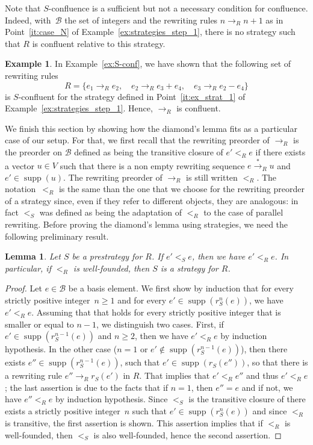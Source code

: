 \documentclass[11pt]{article}
\newtheorem{lemma}[theorem]{Lemma}
\theoremstyle{definition}
\newtheorem{example}[theorem]{Example}
\newcommand\basis{\mathscr{B}}
\newcommand\ordS{<_S}
\newcommand\ordR{<_R}
\DeclareMathOperator{\supp}{supp}
\newcommand\rewR{\to_R}
\newcommand\transR{\overset{*}{\to}_R}
\begin{document}
Note that $S$-confluence is a sufficient but not a necessary condition for
confluence. Indeed, with~$\basis$ the set of integers and the rewriting rules
$n\rewR n+1$ as in Point~\ref{it:case_N} of
Example~\ref{ex:strategies_step_1}, there is no strategy such that $R$ is
confluent relative to this strategy.
\smallskip

\begin{example}\label{ex:conf}
  In Example~\ref{ex:S-conf}, we have shown that the following set of
  rewriting rules
  \[R=\{e_1\rewR e_2,\quad e_2\rewR e_3+e_4,\quad e_3\rewR e_2-e_4\}\]
  is $S$-confluent for the strategy defined in Point~\ref{it:ex_strat_1}
  of Example~\ref{ex:strategies_step_1}. Hence, $\rewR$ is confluent.
\end{example}
\smallskip

We finish this section by showing how the diamond's lemma fits as a
particular case of our setup. For that, we first recall that the
rewriting preorder of $\rewR$ is the preorder on $\basis$ defined as
being the transitive closure of $e'\ordR e$ if there exists a vector
$u\in V$ such that there is a non empty rewriting sequence $e\transR u$
and $e'\in\supp(u)$. The rewriting preorder of $\rewR$ is still written
$\ordR$. The notation~$\ordR$ is the same than the one that we choose for
the rewriting preorder of a strategy since, even if they refer to
different objects, they are analogous: in fact $\ordS$ was defined as
being the adaptation of $\ordR$ to the case of parallel rewriting. Before
proving the diamond's lemma using strategies, we need the following
preliminary result.
\smallskip

\begin{lemma}\label{lem:rew_preorder}
  Let $S$ be a prestrategy for $R$. If $e'\ordS e$, then we have
  $e'\ordR e$. In particular, if $\ordR$ is well-founded, then $S$ is a
  strategy for $R$.
\end{lemma}


\begin{proof}
  Let $e\in\basis$ be a basis element. We first show by induction that
  for every strictly positive integer~$n\geq 1$ and for every
  $e'\in\supp(r_S^n(e))$, we have $e'\ordR e$. Assuming that that holds
  for every strictly positive integer that is smaller or equal to $n-1$,
  we distinguish two cases. First, if $e'\in\supp(r_S^{n-1}(e))$ and
  $n\geq 2$, then we have $e'<_Re$ by induction hypothesis. In the other
  case ($n=1$ or $e'\notin\supp(r_S^{n-1}(e))$), then there exists
  $e''\in\supp(r_S^{n-1}(e))$, such that $e'\in\supp(r_S(e''))$, so that
  there is a rewriting rule $e''\rewR r_S(e')$ in $R$. That implies that
  $e'<_Re''$ and thus $e'<_Re$; the last assertion is due to the facts
  that if $n=1$, then $e''=e$ and if not, we have $e''<_Re$ by induction
  hypothesis. Since $\ordS$ is the transitive closure of there exists a
  strictly positive integer~$n$ such that $e'\in\supp(r_S^n(e))$ and
  since $\ordR$ is transitive, the first assertion is shown. This
  assertion implies that if $\ordR$ is well-founded, then $\ordS$ is also
  well-founded, hence the second assertion.
\end{proof}
\smallskip
\end{document}
